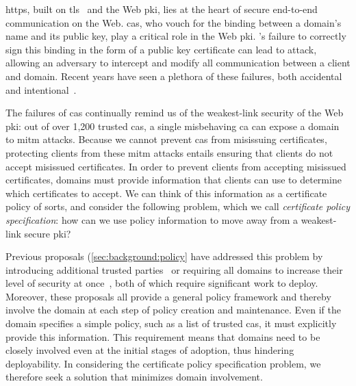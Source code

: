 \acs{https}, built on \ac{tls}~\cite{rfc5246} and the Web \ac{pki}, lies at the
heart of secure end-to-end communication on the Web. \Acp{ca}, who vouch for the
binding between a domain's name and its public key, play a critical role in the
Web \ac{pki}. 's failure to correctly sign this binding in the form of a
public key certificate can lead to  attack, allowing an adversary to
intercept and modify all communication between a client and domain. Recent years
have seen a plethora of these failures, both
accidental~\cite{sleevi2015sustaining} and
intentional~\cite{valsorda2015komodia}.

The failures of \acp{ca} continually remind us of the weakest-link security of
the Web \ac{pki}: out of over 1,200 trusted \acp{ca}, a single misbehaving
\ac{ca} can expose a domain to \ac{mitm} attacks. Because we cannot prevent
\acp{ca} from misissuing certificates, protecting clients from these \ac{mitm}
attacks entails ensuring that clients do not accept misissued certificates. In
order to prevent clients from accepting misissued certificates, domains must
provide information that clients can use to determine which certificates to
accept. We can think of this information as a certificate policy of sorts, and
consider the following problem, which we call \emph{certificate policy
specification}: how can we use policy information to move away from a
weakest-link secure \ac{pki}?

Previous proposals (\autoref{sec:background:policy} have addressed this problem
by introducing additional trusted parties~\cite{kim2013accountable} or requiring
all domains to increase their level of security at once~\cite{basin2014arpki},
both of which require significant work to deploy. Moreover, these proposals all
provide a general policy framework and thereby involve the domain at each step
of policy creation and maintenance. Even if the domain specifies a simple
policy, such as a list of trusted \acp{ca}, it must explicitly provide this
information. This requirement means that domains need to be closely involved
even at the initial stages of adoption, thus hindering deployability. In
considering the certificate policy specification problem, we therefore seek a
solution that minimizes domain involvement.



